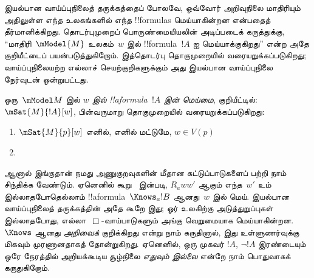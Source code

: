 \documentclass[../../../include/open-logic-section]{subfiles}
\begin{document}


இயல்பான வாய்ப்புநிலைத் தருக்கத்தைப் போலவே, ஒவ்வோர் அறிவுநிலை மாதிரியும்
அதிலுள்ள எந்த உலகங்களில் எந்த !!{formula}s மெய்யாகின்றன என்பதைத்
தீர்மானிக்கிறது. தொடர்புமுறைப் பொருண்மையியலின் அடிப்படைக் கருத்துக்கு,
``மாதிரி~$\mModel{M}$ உலகம்~$w$ இல் !!{formula}~$!A$ ஐ மெய்யாக்குகிறது''
என்ற அதே குறியீட்டைப் பயன்படுத்துகிறோம். இத்தொடர்பு தொகுமுறையில்
வரையறுக்கப்படுகிறது; வாய்ப்புநிலையற்ற எல்லாச் செயற்குறிகளுக்கும் அது இயல்பான
வாய்ப்புநிலை நேர்வுடன் ஒன்றுபட்டது.

\begin{defn}
  ஒரு~$\mModel M$ இல் \emph{$w$ இல் !!a{formula}~$!A$ இன் மெய்மை},
  குறியீட்டில்: $\mSat{M}{!A}[w]$, பின்வருமாறு தொகுமுறையில்
  வரையறுக்கப்படுகிறது:
  \begin{enumerate}
  \item $\mSat{M}{p}[w]$ எனில், எனில் மட்டுமே, $w \in V(p)$
  \item{}
  \end{enumerate}
\end{defn}

ஆனால் இங்குதான் நமது அணுகுறவுகளின் மீதான கட்டுப்பாடுகளைப் பற்றி நாம்
சிந்திக்க வேண்டும். ஏனெனில் கூறு~ இன்படி,
$R_a ww'$ ஆகும் எந்த~$w'$ உம் இல்லாதபோதெல்லாம் !!a{formula}~$\Knows_a !B$
ஆனது~$w$ இல் மெய். இயல்பான வாய்ப்புநிலைத் தருக்கத்தின் அதே கூறே இது; ஓர்
உலகிற்கு அடுத்துறுப்புகள் இல்லாதபோது, எல்லா~$\Box$-வாய்பாடுகளும் அங்கு
வெறுமையாக மெய்யாகின்றன. $\Knows$ ஆனது \emph{அறிவைக்} குறிக்கிறது என்று
நாம் கருதினால், இது உள்ளுணர்வுக்கு மிகவும் முரணானதாகத் தோன்றுகிறது. ஏனெனில்,
ஒரு முகவர் $!A$, $\lnot !A$ இரண்டையும் ஒரே நேரத்தில் அறியக்கூடிய சூழ்நிலை
\emph{எதுவும் இல்லை} என்றே நாம் பொதுவாகக் கருதுகிறோம்.
\end{document}
